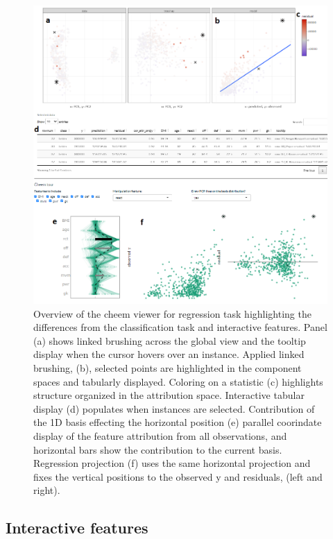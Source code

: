 \documentclass[
]{article}
\begin{document}
\begin{figure}

{\centering \includegraphics[width=1\linewidth]{./figures/app_regression_interactions} 

}

\caption{Overview of the cheem viewer for regression task highlighting the differences from the classification task and interactive features. Panel (a) shows linked brushing across the global view and the tooltip display when the cursor hovers over an instance. Applied linked brushing, (b), selected points are highlighted in the component spaces and tabularly displayed. Coloring on a statistic (c) highlights structure organized in the attribution space. Interactive tabular display (d) populates when instances are selected. Contribution of the 1D basis effecting the horizontal position (e) parallel coorindate display of the feature attribution from all observations, and horizontal bars show the contribution to the current basis. Regression projection (f) uses the same horizontal projection and fixes the vertical positions to the observed y and residuals, (left and right).}\label{fig:regressioncase}
\end{figure}

\hypertarget{interactive-features}{%
\subsection{Interactive features}\label{interactive-features}}
\end{document}
